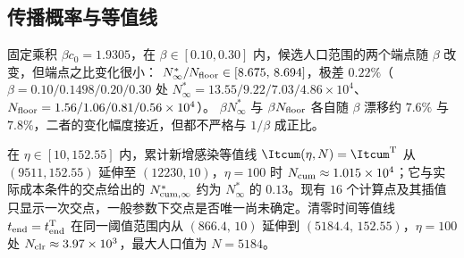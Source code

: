 \FloatBarrier
\subsection{传播概率与等值线}
\label{app:dom:numerics}
固定乘积 $\beta c_0=1.9305$，在 $\beta\in[0.10,0.30]$ 内，候选人口范围的两个端点随 $\beta$ 改变，但端点之比变化很小：
$N^\ast_\infty/N_{\rm floor}\in[8.675,\,8.694]$，极差 $0.22\%$（$\beta=0.10/0.1498/0.20/0.30$ 处
$N^\ast_\infty=13.55/9.22/7.03/4.86\times10^4$、$N_{\rm floor}=1.56/1.06/0.81/0.56\times10^4$）。
$\beta N^\ast_\infty$ 与 $\beta N_{\rm floor}$ 各自随 $\beta$ 漂移约 $7.6\%$ 与 $7.8\%$，二者的变化幅度接近，但都不严格与 $1/\beta$ 成正比。

在 $\eta\in[10,152.55]$ 内，累计新增感染等值线 $\Itcum(\eta,N)=\Itcum^{\rm T}$ 从 $(9511,152.55)$ 延伸至 $(12230,10)$，$\eta=100$ 时 $N_{\rm cum}\approx1.015\times10^4$；它与实际成本条件的交点给出的 $N_{\rm cum,\infty}^\ast$ 约为 $N^\ast_\infty$ 的 $0.13$。现有 $16$ 个计算点及其插值只显示一次交点，一般参数下交点是否唯一尚未确定。清零时间等值线 $t_{\rm end}=t_{\rm end}^{\rm T}$ 在同一阈值范围内从 $(866.4,\,10)$ 延伸到 $(5184.4,\,152.55)$，$\eta=100$ 处 $N_{\rm clr}\approx3.97\times10^{3}$，最大人口值为 $N=5184$。
